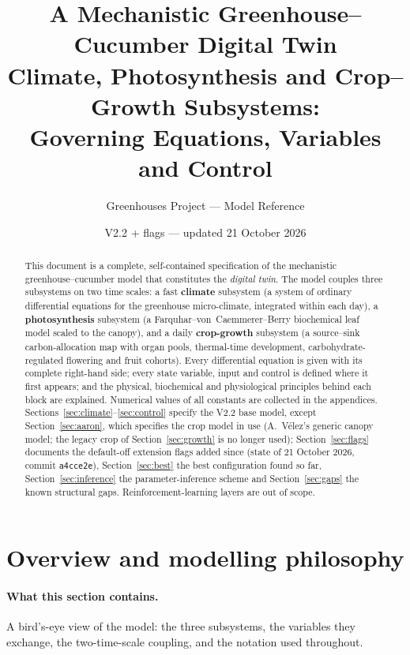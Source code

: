 \documentclass[11pt,a4paper]{article}
\title{\textbf{A Mechanistic Greenhouse--Cucumber Digital Twin}\\[4pt]
\large Climate, Photosynthesis and Crop--Growth Subsystems:\\ Governing Equations, Variables and Control}
\author{Greenhouses Project --- Model Reference}
\date{V2.2 + flags --- updated 21 October 2026}
\begin{document}
\maketitle

\begin{abstract}
\noindent This document is a complete, self-contained specification of the mechanistic
greenhouse--cucumber model that constitutes the \emph{digital twin}. The model couples three
subsystems on two time scales: a fast \textbf{climate} subsystem (a system of ordinary
differential equations for the greenhouse micro-climate, integrated within each day), a
\textbf{photosynthesis} subsystem (a Farquhar--von~Caemmerer--Berry biochemical leaf model scaled
to the canopy), and a daily \textbf{crop-growth} subsystem (a source--sink carbon-allocation map
with organ pools, thermal-time development, carbohydrate-regulated flowering and fruit cohorts).
Every differential equation is given with its complete right-hand side; every state variable,
input and control is defined where it first appears; and the physical, biochemical and
physiological principles behind each block are explained. Numerical values of all constants are
collected in the appendices. Sections~\ref{sec:climate}--\ref{sec:control} specify the V2.2 base
model, except Section~\ref{sec:aaron}, which specifies the crop model in use (A.~V\'elez's generic canopy
model; the legacy crop of Section~\ref{sec:growth} is no longer used); Section~\ref{sec:flags} documents the default-off extension flags added since (state of
21 October 2026, commit \texttt{a4cce2e}), Section~\ref{sec:best} the best configuration found so far,
Section~\ref{sec:inference} the parameter-inference scheme and Section~\ref{sec:gaps} the known structural
gaps. Reinforcement-learning layers are out of scope.
\end{abstract}

\tableofcontents
\bigskip

\section{Overview and modelling philosophy}\label{sec:overview}

\paragraph{What this section contains.} A bird's-eye view of the model: the three subsystems,
the variables they exchange, the two-time-scale coupling, and the notation used throughout.
\end{document}
